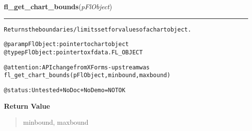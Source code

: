     \label{xformslib:flchart:fl_get_chart_bounds}

    \vspace{0.5ex}

\hspace{.8\funcindent}\begin{boxedminipage}{\funcwidth}

    \raggedright \textbf{fl\_get\_chart\_bounds}(\textit{pFlObject})

    \vspace{-1.5ex}

    \rule{\textwidth}{0.5\fboxrule}
\setlength{\parskip}{2ex}
\begin{alltt}
        Returns the boundaries/limits set for values of a chart object.

        @param pFlObject: pointer to chart object
@type pFlObject: pointer to xfdata.FL\_OBJECT

        @attention: API change from XForms - upstream was
                    fl\_get\_chart\_bounds(pFlObject, minbound, maxbound)

        @status: Untested + NoDoc + NoDemo = NOT OK
    
\end{alltt}

\setlength{\parskip}{1ex}
      \textbf{Return Value}
    \vspace{-1ex}

      \begin{quote}
      minbound, maxbound

      \end{quote}

    \end{boxedminipage}

    \label{xformslib:flchart:fl_set_chart_maxnumb}

    \vspace{0.5ex}

